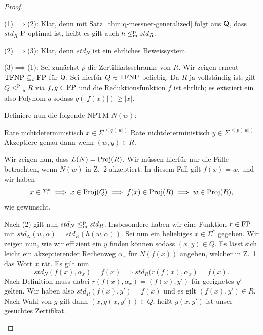 \begin{proof}
    \begin{prooflist}
        \item (1)$\implies$(2): Klar, denn mit Satz~\ref{thm:q-messner-generalized} folgt aus $\hQ$, dass $\mathit{std}_R$ $\P$-optimal ist, heißt es gilt auch $h\leqmp \mathit{std}_R$.

        \item (2)$\implies$(3): Klar, denn $\mathit{std}_N$ ist ein ehrliches Beweissystem.

        \item (3)$\implies$(1): Sei zunächst $p$ die Zertifikatsschranke von $R$. Wir zeigen erneut $\TFNP\subseteqc\FP$ für $\hQ$.
    Sei hierfür $Q\in\TFNP$ beliebig. 
    Da $R$ ja vollständig ist, gilt $Q\leq_\mathrm{L,h}^\mathrm p R$ via $f,g\in\FP$ und die Reduktionsfunktion $f$ ist ehrlich; es existiert ein also Polynom $q$ sodass $q(|f(x)|)\geq |x|$.

    Definiere nun die folgende NPTM $N(w)$:\\
    \begin{algorithm}[H]
        Rate nichtdeterministisch $x\in \Sigma^{\leq q(|w|)}$\;
        Rate nichtdeterministisch $y\in \Sigma^{\leq p(|w|)}$\;
        Akzeptiere genau dann wenn $(w,y)\in R$.
    \end{algorithm}
    Wir zeigen nun, dass $L(N)=\Proj(R)$. Wir müssen hierfür nur die Fälle betrachten, wenn $N(w)$ in Z.~2 akzeptiert.
    In diesem Fall gilt $f(x)=w$, und wir haben
    \[ x\in\Sigma^* \implies x\in\Proj(Q) \implies f(x)\in\Proj(R) \implies w\in\Proj(R), \]
    wie gewünscht.

    Nach (2) gilt nun $\mathit{std}_N\leqmp \mathit{std}_R$. Insbesondere haben wir eine Funktion $r\in\FP$ mit
    $\mathit{std}_N(w, \alpha)=\mathit{std}_R(h(w,\alpha))$.
    Sei nun ein beliebiges $x\in\Sigma^*$ gegeben. Wir zeigen nun, wie wir effizient ein $y$ finden können sodass $(x,y)\in Q$. 
    Es lässt sich leicht ein akzeptierender Rechenweg $\alpha_x$ für $N(f(x))$ angeben, welcher in Z.~1 das Wort $x$ rät.
    Es gilt nun
    \[ \mathit{std}_N(f(x), \alpha_x)=f(x) \implies \mathit{std}_R(r(f(x), \alpha_x)=f(x). \]
    Nach Definition muss dabei $r(f(x), \alpha_x)=(f(x), y')$ für geeignetes $y'$ gelten.
    Wir haben also $\mathit{std}_R(f(x), y')=f(x)$ und es gilt $(f(x), y')\in R$. Nach Wahl von $g$ gilt dann $(x, g(x, y'))\in Q$, heißt $g(x, y')$ ist unser gesuchtes Zertifikat. 
    \end{prooflist}
\end{proof}

